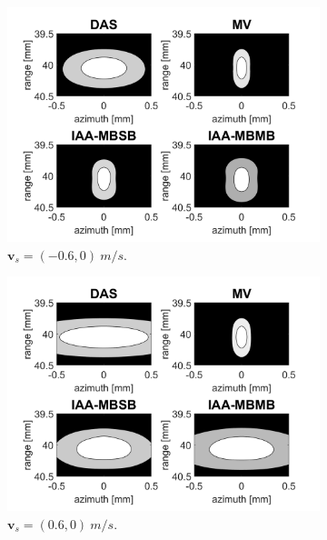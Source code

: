 \begin{figure}[ht]
    \centering
    \begin{subfigure}[t]{0.48\linewidth}
        \includegraphics[width=\linewidth]{./images/results/2.1/motion_0_-06.png}
        \caption{$\boldsymbol{v}_s = (-0.6, 0)~m/s$.}
    \end{subfigure}
    \quad
    \begin{subfigure}[t]{0.48\linewidth}
        \includegraphics[width=\linewidth]{./images/results/2.1/motion_0_06.png}
        \caption{$\boldsymbol{v}_s = (0.6, 0)~m/s$.}
    \end{subfigure}
    \quad
    \begin{subfigure}[t]{0.48\linewidth}

\end{subfigure}
\end{figure}
